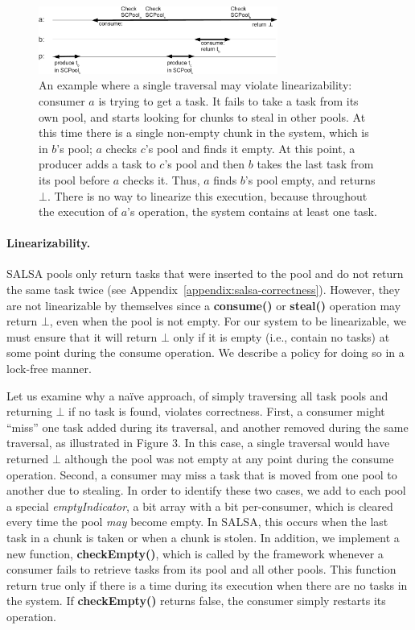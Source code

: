 \begin{figure}[htb]
	\centering
	\includegraphics[width=0.7\textwidth]{figures/linearizability-example}
	\vspace{-10pt}
	\caption{\footnotesize{An example where a single traversal may violate linearizability: consumer $a$ is trying to get a task. It fails to take a task from its own pool, and starts looking for chunks to steal in other pools. At this time there is a single non-empty chunk in the system, which is in $b$'s pool; $a$ checks $c$'s pool and finds it empty. At this point, a producer adds a task to $c$'s pool and then $b$ takes the last task from its pool before $a$ checks it. Thus, $a$ finds $b$'s pool empty, and returns $\bot$. There is no way to linearize this execution, because throughout the execution of $a$'s operation, the system contains at least one task.}}
	\vspace{-5pt}
	\label{fig:linearizability-example}
\end{figure}

\paragraph{Linearizability.}
SALSA pools only return tasks that were inserted to the pool and do not return the same task twice (see Appendix~\ref{appendix:salsa-correctness}). However, they are not linearizable by themselves since a {\bf consume()} or {\bf steal()} operation may return $\bot$, even when the pool is not empty. For our system to be linearizable, we must ensure that it will return $\bot$ only if it is empty (i.e., contain no tasks) at some point during the consume operation. We describe a policy for doing so in a lock-free manner. 

Let us examine why a na\"ive approach, of simply traversing all task pools and returning $\bot$ if no task is found, violates correctness. First, a consumer might ``miss'' one task added during its traversal, and another removed during the same traversal, as illustrated in Figure 3. In this case, a single traversal would have returned $\bot$ although the pool was not empty at any point during the consume operation. Second, a consumer may miss a task that is moved from one pool to another due to stealing. In order to identify these two cases, we add to each pool a special \emph{emptyIndicator}, a bit array with a bit per-consumer, which is cleared every time the pool \emph{may} become empty. In SALSA, this occurs when the last task in a chunk is taken or when a chunk is stolen. 
In addition, we implement a new function, {\bf checkEmpty()}, which is called by the framework whenever a consumer fails to retrieve tasks from its pool and all other pools. This function return true only if there is a time during its execution when there are no tasks in the system. If {\bf checkEmpty()} returns false, the consumer simply restarts its operation. 

